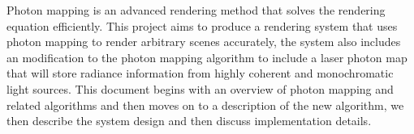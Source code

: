 Photon mapping is an advanced rendering method that solves the rendering equation efficiently. This project aims to produce a rendering system that uses photon mapping to render arbitrary scenes accurately, the system also includes an modification to the photon mapping algorithm to include a laser photon map that will store radiance information from highly coherent and monochromatic light
sources. This document begins with an overview of photon mapping and related algorithms and then moves on to a description of
the new algorithm, we then describe the system design and then discuss implementation details.

